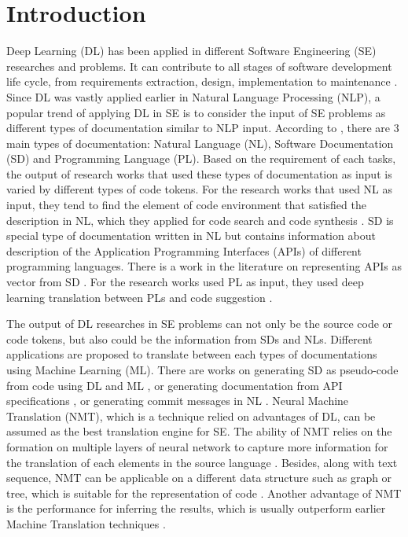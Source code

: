 \section{Introduction}
Deep Learning (DL) has been applied in different Software Engineering (SE) researches and problems\cite{001,002,003}. It can contribute to all stages of software development life cycle, from requirements extraction, design, implementation to maintenance \cite{001}. Since DL was vastly applied earlier in Natural Language Processing (NLP), a popular trend of applying DL in SE is to consider the input of SE problems as different types of documentation similar to NLP input. According to \cite{003}, there are 3 main types of documentation: Natural Language (NL), Software Documentation (SD) and Programming Language (PL). Based on the requirement of each tasks, the output of research works that used these types of documentation as input is varied by different types of code tokens. For the research works that used NL as input, they tend to find the element of code environment that satisfied the description in NL, which they applied for code search \cite{004,005} and code synthesis \cite{006}. SD is special type of documentation written in NL but contains information about description of the Application Programming Interfaces (APIs) of different programming languages. There is a work in the literature on representing APIs as vector from SD \cite{007}. For the research works used PL as input, they used deep learning translation between PLs \cite{009} and code suggestion \cite{008}.

The output of DL researches in SE problems can not only be the source code or code tokens, but also could be the information from SDs and NLs.  Different applications are proposed to translate between each types of documentations using Machine Learning (ML). There are works on generating SD as pseudo-code from code using DL and ML \cite{010,011}, or generating documentation from API specifications \cite{012}, or generating commit messages in NL \cite{013}. Neural Machine Translation (NMT), which is a technique relied on advantages of DL, can be assumed as the best translation engine for SE. The ability of NMT relies on the formation on multiple layers of neural network to capture more information for the translation of each elements in the source language \cite{014}. Besides, along with text sequence, NMT can be applicable on a different data structure such as graph or tree, which is suitable for the representation of code \cite{015}. Another advantage of NMT is the performance for inferring the results, which is usually outperform earlier Machine Translation techniques \cite{014}.


